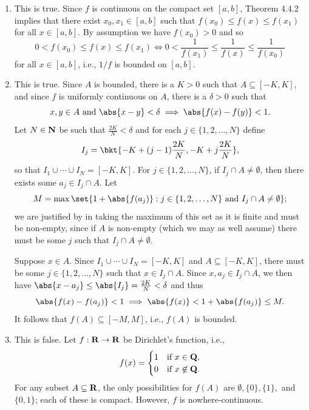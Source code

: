 \documentclass{lew98_solutions}
\begin{document}
\begin{solution}
    \begin{enumerate}
        \item This is true. Since \( f \) is continuous on the compact set \( [a, b] \), Theorem 4.4.2 implies that there exist \( x_0, x_1 \in [a, b] \) such that \( f(x_0) \leq f(x) \leq f(x_1) \) for all \( x \in [a, b] \). By assumption we have \( f(x_0) > 0 \) and so
        \[
            0 < f(x_0) \leq f(x) \leq f(x_1) \iff 0 < \frac{1}{f(x_1)} \leq \frac{1}{f(x)} \leq \frac{1}{f(x_0)}
        \]
        for all \( x \in [a, b] \), i.e., \( 1/f \) is bounded on \( [a, b] \).

        \item This is true. Since \( A \) is bounded, there is a \( K > 0 \) such that \( A \subseteq [-K, K] \), and since \( f \) is uniformly continuous on \( A \), there is a \( \delta > 0 \) such that
        \[
            x, y \in A \text{ and } \abs{x - y} < \delta \implies \abs{f(x) - f(y)} < 1.
        \]
        Let \( N \in \mathbf{N} \) be such that \( \tfrac{2K}{N} < \delta \) and for each \( j \in \{ 1, 2, \ldots, N \} \) define
        \[
            I_j = \bkt{ -K + (j - 1) \frac{2K}{N}, -K + j \frac{2K}{N} },
        \]
        so that \( I_1 \cup \cdots \cup I_N = [-K, K] \). For \( j \in \{ 1, 2, \ldots, N \} \), if \( I_j \cap A \neq \emptyset \), then there exists some \( a_j \in I_j \cap A \). Let
        \[
            M = \max \set{ 1 + \abs{f(a_j)} : j \in \{ 1, 2, \ldots, N \} \text{ and } I_j \cap A \neq \emptyset };
        \]
        we are justified by  in taking the maximum of this set as it is finite and must be non-empty, since if \( A \) is non-empty (which we may as well assume) there must be some \( j \) such that \( I_j \cap A \neq \emptyset \).

        Suppose \( x \in A \). Since \( I_1 \cup \cdots \cup I_N = [-K, K] \) and \( A \subseteq [-K, K] \), there must be some \( j \in \{ 1, 2, \ldots, N \} \) such that \( x \in I_j \cap A \). Since \( x, a_j \in I_j \cap A \), we then have \( \abs{x - a_j} \leq \abs{I_j} = \tfrac{2K}{N} < \delta \) and thus
        \[
            \abs{f(x) - f(a_j)} < 1 \implies \abs{f(x)} < 1 + \abs{f(a_j)} \leq M.
        \]
        It follows that \( f(A) \subseteq [-M, M] \), i.e., \( f(A) \) is bounded.

        \item This is false. Let \( f : \mathbf{R} \to \mathbf{R} \) be Dirichlet's function, i.e.,
        \[
            f(x) = \begin{cases}
                1 & \text{if } x \in \mathbf{Q}, \\
                0 & \text{if } x \not\in \mathbf{Q}.
            \end{cases}
        \]
        For any subset \( A \subseteq \mathbf{R} \), the only possibilities for \( f(A) \) are \( \emptyset, \{ 0 \}, \{ 1 \}, \) and \( \{ 0, 1 \} \); each of these is compact. However, \( f \) is nowhere-continuous.
    \end{enumerate}
\end{solution}
\end{document}
